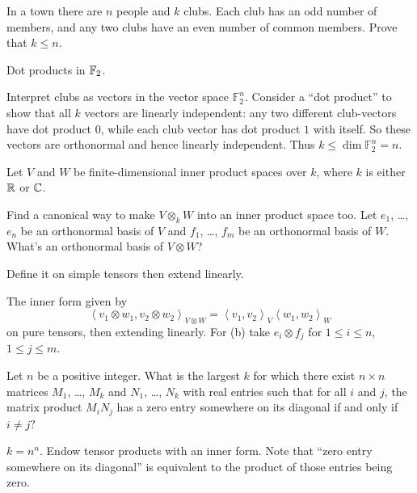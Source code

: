 \begin{problem}
	\onechili
	In a town there are $n$ people and $k$ clubs.
	Each club has an odd number of members,
	and any two clubs have an even number of common members.
	Prove that $k \le n$.
	\begin{hint}
		Dot products in $\mathbb F_2$.
	\end{hint}
	\begin{sol}
		Interpret clubs as vectors in the vector space $\mathbb F_2^n$.
		Consider a ``dot product''
		to show that all $k$ vectors are linearly independent:
		any two different club-vectors have dot product $0$,
		while each club vector has dot product $1$ with itself.
		So these vectors are orthonormal and hence linearly independent.
		Thus $k \le \dim \mathbb F_2^n = n$.
	\end{sol}
\end{problem}

\begin{sproblem}
	\label{prob:inner_prod_tensor}
	Let $V$ and $W$ be finite-dimensional inner product spaces over $k$,
	where $k$ is either $\mathbb R$ or $\mathbb C$.
	\begin{enumerate}[(a)]
		\ii Find a canonical way to make $V \otimes_k W$ into an inner product space too.
		\ii Let $e_1$, \dots, $e_n$ be an orthonormal basis of $V$
		and $f_1$, \dots, $f_m$ be an orthonormal basis of $W$.
		What's an orthonormal basis of $V \otimes W$?
	\end{enumerate}
	\begin{hint}
		Define it on simple tensors then extend linearly.
	\end{hint}
	\begin{sol}
		The inner form given by
		\[ \left< v_1 \otimes w_1 , v_2 \otimes w_2 \right>_{V \otimes W}
		= \left< v_1,v_2 \right>_V \left< w_1,w_2\right>_W \]
		on pure tensors, then extending linearly.
		For (b) take $e_i \otimes f_j$ for $1 \le i \le n$, $1 \le j \le m$.
	\end{sol}
\end{sproblem}

\begin{problem}[Putnam 2014]
	\onechili
	Let $n$ be a positive integer.
	What is the largest $k$ for which there exist $n \times n$ matrices
	$M_1$, \dots, $M_k$ and $N_1$, \dots, $N_k$
	with real entries such that for all $i$ and $j$,
	the matrix product $M_i N_j$ has a zero entry somewhere
	on its diagonal if and only if $i \neq j?$
	\begin{hint}
		$k = n^n$.
		Endow tensor products with an inner form.
		Note that ``zero entry somewhere on its diagonal''
		is equivalent to the product of those entries being zero.
	\end{hint}
\end{problem}

